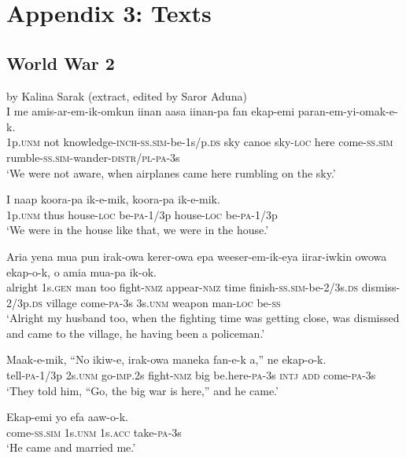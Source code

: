 
\chapter{Appendix 3: Texts}

\setcounter{equation}{0}
\section{World War 2}
  by Kalina Sarak  (extract, edited by Saror Aduna) \\
\ea
\gll  I  me  amis-ar-em-ik-omkun  iinan  aasa  iinan-pa  fan  ekap-emi  paran-em-yi-omak-e-k. \\
1p.\textsc{unm}  not  knowledge-\textsc{inch}-\textsc{ss}.\textsc{sim}-be-1s/p.\textsc{ds}  sky  canoe sky-\textsc{loc}  here  come-\textsc{ss}.\textsc{sim}  rumble-\textsc{ss}.\textsc{sim}-wander-\textsc{distr}/\textsc{pl}-\textsc{pa}-3s \\
\glt ‘We were not aware, when airplanes came here rumbling on the sky.’
\z


\ea
\gll  I  naap  koora-pa  ik-e-mik,  koora-pa  ik-e-mik. \\
1p.\textsc{unm}  thus  house-\textsc{loc}  be-\textsc{pa}-1/3p  house-\textsc{loc}  be-\textsc{pa}-1/3p \\
\glt ‘We were in the house like that, we were in the house.’
\z


\ea
\gll  Aria  yena  mua  pun  irak-owa  kerer-owa  epa weeser-em-ik-eya  iirar-iwkin  owowa  ekap-o-k, o  amia  mua-pa  ik-ok. \\
alright  1s.\textsc{gen}  man  too  fight-\textsc{nmz}  appear-\textsc{nmz}  time finish-\textsc{ss}.\textsc{sim}-be-2/3s.\textsc{ds}  dismiss-2/3p.\textsc{ds}  village  come-\textsc{pa}-3s 3s.\textsc{unm}  weapon  man-\textsc{loc}  be-\textsc{ss} \\
\glt ‘Alright my husband too, when the fighting time was getting close, was dismissed and came to the village, he having been a policeman.’ \\
\z


\ea
\gll  Maak-e-mik,  “No  ikiw-e,  irak-owa  maneka  fan-e-k a,”  ne  ekap-o-k. \\
tell-\textsc{pa}-1/3p  2s.\textsc{unm}  go-\textsc{imp}.2s  fight-\textsc{nmz}  big  be.here-\textsc{pa}-3s \textsc{intj}  \textsc{add}  come-\textsc{pa}-3s \\
\glt ‘They told him, “Go, the big war is here,” and he came.’ \\
\z


\ea
\gll  Ekap-emi  yo  efa  aaw-o-k. \\
come-\textsc{ss}.\textsc{sim}  1s.\textsc{unm}  1s.\textsc{acc}  take-\textsc{pa}-3s \\
\glt ‘He came and married me.’ \\
\z


